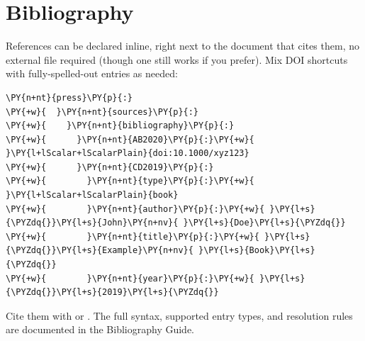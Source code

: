 \documentclass[a4paper,twoside]{article}
\begin{document}
\section{Bibliography}
References can be declared inline, right next to the document that cites them, no external  file required (though one still works if you prefer). Mix DOI shortcuts with fully-spelled-out entries as needed:
\begin{tscode}[lang=yaml, engine=pygments]
\begin{Verbatim}[commandchars=\\\{\},breaklines, breakanywhere, commandchars=\\\{\}]
\PY{n+nt}{press}\PY{p}{:}
\PY{+w}{  }\PY{n+nt}{sources}\PY{p}{:}
\PY{+w}{    }\PY{n+nt}{bibliography}\PY{p}{:}
\PY{+w}{      }\PY{n+nt}{AB2020}\PY{p}{:}\PY{+w}{ }\PY{l+lScalar+lScalarPlain}{doi:10.1000/xyz123}
\PY{+w}{      }\PY{n+nt}{CD2019}\PY{p}{:}
\PY{+w}{        }\PY{n+nt}{type}\PY{p}{:}\PY{+w}{ }\PY{l+lScalar+lScalarPlain}{book}
\PY{+w}{        }\PY{n+nt}{author}\PY{p}{:}\PY{+w}{ }\PY{l+s}{\PYZdq{}}\PY{l+s}{John}\PY{n+nv}{ }\PY{l+s}{Doe}\PY{l+s}{\PYZdq{}}
\PY{+w}{        }\PY{n+nt}{title}\PY{p}{:}\PY{+w}{ }\PY{l+s}{\PYZdq{}}\PY{l+s}{Example}\PY{n+nv}{ }\PY{l+s}{Book}\PY{l+s}{\PYZdq{}}
\PY{+w}{        }\PY{n+nt}{year}\PY{p}{:}\PY{+w}{ }\PY{l+s}{\PYZdq{}}\PY{l+s}{2019}\PY{l+s}{\PYZdq{}}
\end{Verbatim}
\end{tscode}
Cite them with  or . The full syntax, supported entry types, and resolution rules are documented in the Bibliography Guide.
\end{document}
